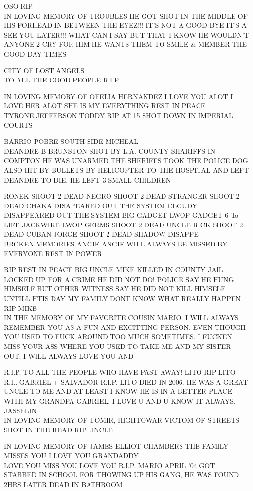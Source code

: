 \documentclass[10pt,letterpaper]{article}
\begin{document}
OSO RIP\\
IN LOVING MEMORY OF TROUBLES HE GOT SHOT IN THE MIDDLE OF HIS FORHEAD IN BETWEEN THE EYEZ!!! IT'S NOT A GOOD{-}BYE IT'S A SEE YOU LATER!!! WHAT CAN I SAY BUT THAT I KNOW HE WOULDN'T ANYONE 2 CRY FOR HIM HE WANTS THEM TO SMILE \& MEMBER THE GOOD DAY TIMES

CITY OF LOST ANGELS\\
TO ALL THE GOOD PEOPLE R.I.P.

IN LOVING MEMORY OF OFELIA HERNANDEZ I LOVE YOU ALOT I LOVE HER ALOT SHE IS MY EVERYTHING REST IN PEACE\\
TYRONE JEFFERSON TODDY RIP AT 15 SHOT DOWN IN IMPERIAL COURTS

BARRIO POBRE SOUTH SIDE MICHEAL\\
DEANDRE B BRUNSTON SHOT BY L.A. COUNTY SHARIFFS IN COMPTON HE WAS UNARMED THE SHERIFFS TOOK THE POLICE DOG ALSO HIT BY BULLETS BY HELICOPTER TO THE HOSPITAL AND LEFT DEANDRE TO DIE.  HE LEFT 3 SMALL CHILDREN

RONEK SHOOT 2 DEAD NEGRO SHOOT 2 DEAD STRANGER SHOOT 2 DEAD CHAKA DISAPEARED OUT THE SYSTEM CLOUDY DISAPPEARED OUT THE SYSTEM BIG GADGET LWOP GADGET 6{-}To{-}LIFE JACKWIRE LWOP GERMS SHOOT 2 DEAD UNCLE RICK SHOOT 2 DEAD CUBAN JORGE SHOOT 2 DEAD SHADOW DISAPPE\\
BROKEN MEMORIES ANGIE ANGIE WILL ALWAYS BE MISSED BY EVERYONE REST IN POWER

RIP REST IN PEACE BIG UNCLE MIKE KILLED IN COUNTY JAIL.  LOCKED UP FOR A CRIME HE DID NOT DO!  POLICE SAY HE HUNG HIMSELF BUT OTHER WITNESS SAY HE DID NOT KILL HIMSELF UNTILL HTIS DAY MY FAMILY DONT KNOW WHAT REALLY HAPPEN RIP MIKE\\
IN THE MEMORY OF MY FAVORITE COUSIN MARIO.  I WILL ALWAYS REMEMBER YOU AS A FUN AND EXCITTING PERSON.  EVEN THOUGH YOU USED TO FUCK AROUND TOO MUCH SOMETIMES.  I FUCKEN MISS YOUR ASS WHERE YOU USED TO TAKE ME AND MY SISTER OUT.  I WILL ALWAYS LOVE YOU AND

R.I.P. TO ALL THE PEOPLE WHO HAVE PAST AWAY!  LITO RIP LITO R.I.. GABRIEL + SALVADOR R.I.P. LITO DIED IN 2006.  HE WAS A GREAT UNCLE TO ME AND AT LEAST I KNOW HE IS IN A BETTER PLACE WITH MY GRANDPA GABRIEL.  I LOVE U AND U KNOW IT ALWAYS, JASSELIN\\
IN LOVING MEMORY OF TOMIR, HIGHTOWAR VICTOM OF STREETS SHOT IN THE HEAD RIP UNCLE

IN LOVING MEMORY OF JAMES ELLIOT CHAMBERS THE FAMILY MISSES YOU I LOVE YOU GRANDADDY\\
LOVE YOU MISS YOU LOVE YOU R.I.P. MARIO APRIL '04 GOT STABBED IN SCHOOL FOR THOWING UP HIS GANG, HE WAS FOUND 2HRS LATER DEAD IN BATHROOM
\end{document}

